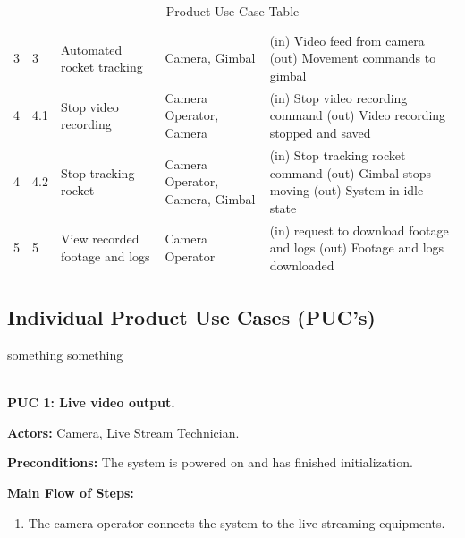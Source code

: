 \documentclass[12pt]{article}
\begin{document}
\begin{table}[H]
\begin{tabularx}{\textwidth}{p{0.4in}p{0.4in}p{1.25in}p{1in}X}
    3                               & 3                       & Automated rocket tracking      &
    Camera, Gimbal                  &
    (in) Video feed from camera \newline
    (out) Movement commands to gimbal                                                            \\
    4                               & 4.1                     & Stop video recording           &
    Camera Operator, Camera         &
    (in) Stop video recording command \newline
    (out) Video recording stopped and saved                                                      \\
    4                               & 4.2                     & Stop tracking rocket           &
    Camera Operator, Camera, Gimbal &
    (in) Stop tracking rocket command \newline
    (out) Gimbal stops moving \newline
    (out) System in idle state                                                                   \\
    5                               & 5                       & View recorded footage and logs &
    Camera Operator                 &
    (in) request to download footage and logs \newline
    (out) Footage and logs downloaded                                                            \\

    \bottomrule
  \end{tabularx}
  \caption{Product Use Case Table}
  \label{tab:product-use-case-table}
\end{table}

\subsection{Individual Product Use Cases (PUC's)}

something something

~\\

\textbf{PUC 1: Live video output.}

\textbf{Actors:} Camera, Live Stream Technician.

\textbf{Preconditions:} The system is powered on and has finished initialization.

\textbf{Main Flow of Steps:}
\begin{enumerate}
  \item The camera operator connects the system to the live streaming equipments.
\end{enumerate}
\end{document}
